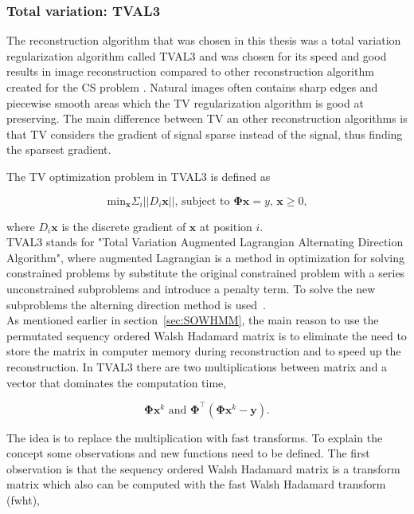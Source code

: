 \subsubsection{Total variation: TVAL3}
\label{sec:TV}
The reconstruction algorithm that was chosen in this thesis was a total variation regularization algorithm called TVAL3 and was chosen for its speed and good results in image reconstruction compared to other reconstruction algorithm created for the CS problem \cite{article:TVAL3}. Natural images often contains sharp edges and piecewise smooth areas which the TV regularization algorithm is good at preserving. The main difference between TV an other reconstruction algorithms is that TV considers the gradient of signal sparse instead of the signal, thus finding the sparsest gradient. 

The TV optimization problem in TVAL3 is defined as  

\begin{equation}
\text{min}_\mathbf{x} \Sigma_i ||D_i \mathbf{x} || \text{, subject to } \mathbf{\Phi x} = 	y \text{, } \mathbf{x} \geq 0 \text{,} 
\label{eq:tval3}
\end{equation}

where $D_i\mathbf{x}$ is the discrete gradient of $\mathbf{x}$ at position $i$.\\[0.1in]

TVAL3 stands for "Total Variation Augmented Lagrangian Alternating Direction Algorithm", where augmented Lagrangian is a method in optimization for solving constrained problems by substitute the original constrained problem with a series unconstrained subproblems and introduce a penalty term. To solve the new subproblems the alterning direction method is used~\cite{article:TVAL3}.\\[0.1in]

As mentioned earlier in section~\ref{sec:SOWHMM}, the main reason to use the permutated sequency ordered Walsh Hadamard matrix is to eliminate the need to store the matrix in computer memory during reconstruction and to speed up the reconstruction. In TVAL3 there are two multiplications between matrix and a vector that dominates the computation time,

\begin{equation}
\mathbf{\Phi}\mathbf{x}^k \text{ and } \mathbf{\Phi}^\top(\mathbf{\Phi}\mathbf{x}^k-\mathbf{y})\text{.}
\end{equation}

The idea is to replace the multiplication with fast transforms. To explain the concept some observations and new functions need to be defined. The first observation is that the sequency ordered Walsh Hadamard matrix is a transform matrix which also can be computed with the fast Walsh Hadamard transform (fwht),

